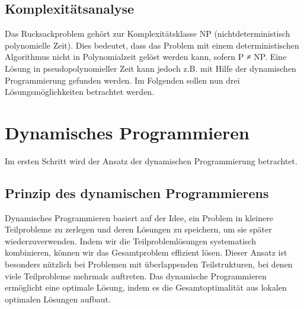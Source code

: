 \documentclass[12pt]{report}
\begin{document}
\section{Komplexitätsanalyse}
Das Rucksackproblem gehört zur Komplexitätsklasse NP (nichtdeterministisch polynomielle Zeit). Dies bedeutet, dass das Problem mit einem deterministischen Algorithmus nicht in Polynomialzeit gelöst werden kann, sofern P ≠ NP. Eine Lösung in pseudopolynomieller Zeit kann jedoch z.B. mit Hilfe der dynamischen Programmierung gefunden werden. \cite{assi8672677}
Im Folgenden sollen nun drei Lösungsmöglichkeiten betrachtet werden.


\newpage
\chapter{Dynamisches Programmieren}
Im ersten Schritt wird der Ansatz der dynamischen Programmierung betrachtet.
\section{Prinzip des dynamischen Programmierens}
Dynamisches Programmieren basiert auf der Idee, ein Problem in kleinere Teilprobleme zu zerlegen und deren Lösungen zu speichern, um sie später wiederzuverwenden. Indem wir die Teilproblemlösungen systematisch kombinieren, können wir das Gesamtproblem effizient lösen. Dieser Ansatz ist besonders nützlich bei Problemen mit überlappenden Teilstrukturen, bei denen viele Teilprobleme mehrmals auftreten. Das dynamische Programmieren ermöglicht eine optimale Lösung, indem es die Gesamtoptimalität aus lokalen optimalen Lösungen aufbaut.\cite{cormen2022introduction}

\end{document}

